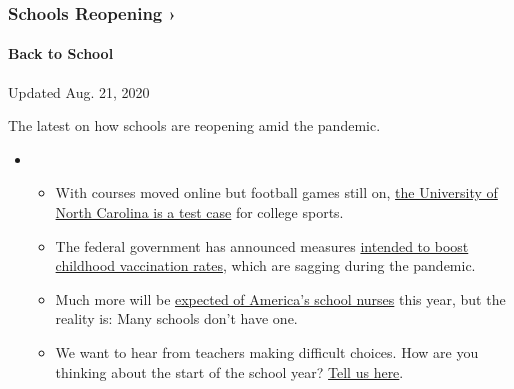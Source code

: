 \href{https://www.nytimes3xbfgragh.onion/spotlight/schools-reopening?action=click\&pgtype=Article\&state=default\&region=MAIN_CONTENT_3\&context=storylines_keepup}{}

\hypertarget{schools-reopening-}{%
\subsubsection{Schools Reopening ›}\label{schools-reopening-}}

\hypertarget{back-to-school}{%
\paragraph{Back to School}\label{back-to-school}}

Updated Aug. 21, 2020

The latest on how schools are reopening amid the pandemic.

\begin{itemize}
\item
  \begin{itemize}
  \tightlist
  \item
    With courses moved online but football games still on,
    \href{https://www.nytimes3xbfgragh.onion/2020/08/18/sports/ncaafootball/unc-football-acc-online-classes.html?action=click\&pgtype=Article\&state=default\&region=MAIN_CONTENT_3\&context=storylines_keepup}{the
    University of North Carolina is a test case} for college sports.
  \item
    The federal government has announced measures
    \href{https://www.nytimes3xbfgragh.onion/2020/08/20/health/coronavirus-flu-vaccine.html?action=click\&pgtype=Article\&state=default\&region=MAIN_CONTENT_3\&context=storylines_keepup}{intended
    to boost childhood vaccination rates}, which are sagging during the
    pandemic.
  \item
    Much more will be
    \href{https://www.nytimes3xbfgragh.onion/2020/08/20/us/schools-reopening-nurses-covid.html?action=click\&pgtype=Article\&state=default\&region=MAIN_CONTENT_3\&context=storylines_keepup}{expected
    of America's school nurses} this year, but the reality is: Many
    schools don't have one.
  \item
    We want to hear from teachers making difficult choices. How are you
    thinking about the start of the school year?
    \href{https://www.nytimes3xbfgragh.onion/2020/08/19/us/teachers-school-reopenings.html?action=click\&pgtype=Article\&state=default\&region=MAIN_CONTENT_3\&context=storylines_keepup}{Tell
    us here}.
  \end{itemize}
\end{itemize}

